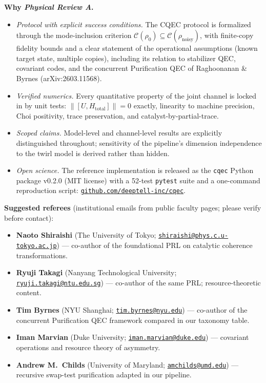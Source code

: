 \documentclass[11pt,a4paper]{article}
\begin{document}
\medskip

\textbf{Why \emph{Physical Review A}.}
\begin{itemize}
\item \emph{Protocol with explicit success conditions.} The CQEC protocol is formalized through the mode-inclusion criterion $\mathcal{C}(\rho_{0}) \subseteq \mathcal{C}(\rho_\mathrm{noisy})$, with finite-copy fidelity bounds and a clear statement of the operational assumptions (known target state, multiple copies), including its relation to stabilizer QEC, covariant codes, and the concurrent Purification QEC of Raghoonanan \& Byrnes (arXiv:2603.11568).
\item \emph{Verified numerics.} Every quantitative property of the joint channel is locked in by unit tests: $\|[U, H_\mathrm{total}]\| = 0$ exactly, linearity to machine precision, Choi positivity, trace preservation, and catalyst-by-partial-trace.
\item \emph{Scoped claims.} Model-level and channel-level results are explicitly distinguished throughout; sensitivity of the pipeline's dimension independence to the twirl model is derived rather than hidden.
\item \emph{Open science.} The reference implementation is released as the \texttt{cqec} Python package v0.2.0 (MIT license) with a 52-test \texttt{pytest} suite and a one-command reproduction script: \href{https://github.com/deeptell-inc/cqec}{\texttt{github.com/deeptell-inc/cqec}}.
\end{itemize}

\medskip

\textbf{Suggested referees} (institutional emails from public faculty pages; please verify before contact):
\begin{itemize}
\item \textbf{Naoto Shiraishi} (The University of Tokyo; \href{mailto:shiraishi@phys.c.u-tokyo.ac.jp}{\texttt{shiraishi@phys.c.u-tokyo.ac.jp}}) --- co-author of the foundational PRL on catalytic coherence transformations.
\item \textbf{Ryuji Takagi} (Nanyang Technological University; \href{mailto:ryuji.takagi@ntu.edu.sg}{\texttt{ryuji.takagi@ntu.edu.sg}}) --- co-author of the same PRL; resource-theoretic content.
\item \textbf{Tim Byrnes} (NYU Shanghai; \href{mailto:tim.byrnes@nyu.edu}{\texttt{tim.byrnes@nyu.edu}}) --- co-author of the concurrent Purification QEC framework compared in our taxonomy table.
\item \textbf{Iman Marvian} (Duke University; \href{mailto:iman.marvian@duke.edu}{\texttt{iman.marvian@duke.edu}}) --- covariant operations and resource theory of asymmetry.
\item \textbf{Andrew M.~Childs} (University of Maryland; \href{mailto:amchilds@umd.edu}{\texttt{amchilds@umd.edu}}) --- recursive swap-test purification adapted in our pipeline.
\end{itemize}
\end{document}

